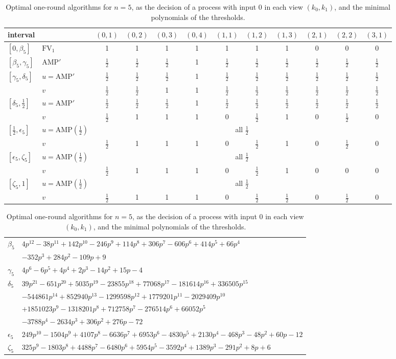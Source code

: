 \documentclass[11pt]{article}
\newcommand{\h}{\tfrac12}
\begin{document}
\begin{table}[t]
\centering
\small
\renewcommand{\arraystretch}{1.35}
\begin{tabular}{llcccccccccc}
\toprule
interval & & $(0,1)$&$(0,2)$&$(0,3)$&$(0,4)$&$(1,1)$&$(1,2)$&$(1,3)$&$(2,1)$&$(2,2)$&$(3,1)$\\
\midrule
$[0,\beta_5]$ & $\mathrm{FV}_1$ & 1&1&1&1&1&1&1&0&0&0\\
$[\beta_5,\gamma_5]$ & $\mathrm{AMP}'$ & $\h$&$\h$&$\h$&1&$\h$&$\h$&$\h$&$\h$&$\h$&$\h$\\
$[\gamma_5,\delta_5]$ & $u=\mathrm{AMP}'$ & $\h$&$\h$&$\h$&1&$\h$&$\h$&$\h$&$\h$&$\h$&$\h$\\
 & $v$ & $\h$&$\h$&1&1&$\h$&$\h$&$\h$&$\h$&$\h$&$\h$\\
$[\delta_5,\h]$ & $u=\mathrm{AMP}'$ & $\h$&$\h$&$\h$&1&$\h$&$\h$&$\h$&$\h$&$\h$&$\h$\\
 & $v$ & $\h$&1&1&1&0&$\h$&1&0&$\h$&0\\
$[\h,\epsilon_5]$ & $u=\mathrm{AMP}(\h)$ & \multicolumn{10}{c}{all $\h$}\\
 & $v$ & $\h$&1&1&1&0&$\h$&1&0&$\h$&0\\
$[\epsilon_5,\zeta_5]$ & $u=\mathrm{AMP}(\h)$ & \multicolumn{10}{c}{all $\h$}\\
 & $v$ & $\h$&1&1&1&0&$\h$&1&0&0&0\\
$[\zeta_5,1]$ & $u=\mathrm{AMP}(\h)$ & \multicolumn{10}{c}{all $\h$}\\
 & $v$ & $\h$&1&1&1&0&$\h$&$\h$&0&$\h$&0\\
\bottomrule
\end{tabular}

\medskip
\begin{tabular}{ll}
\toprule
$\beta_5$ & $4p^{12}-38p^{11}+142p^{10}-246p^9+114p^8+306p^7-606p^6+414p^5+66p^4$\\
 & \qquad$-352p^3+284p^2-109p+9$\\
$\gamma_5$ & $4p^6-6p^5+4p^4+2p^3-14p^2+15p-4$\\
$\delta_5$ & $39p^{21}-651p^{20}+5035p^{19}-23855p^{18}+77068p^{17}-181614p^{16}+336505p^{15}$\\
 & \qquad$-544861p^{14}+852940p^{13}-1299598p^{12}+1779201p^{11}-2029409p^{10}$\\
 & \qquad$+1851023p^{9}-1318201p^{8}+712758p^{7}-276514p^{6}+66052p^{5}$\\
 & \qquad$-3788p^{4}-2634p^{3}+306p^{2}+276p-72$\\
$\epsilon_5$ & $249p^{10}-1504p^9+4107p^8-6636p^7+6953p^6-4830p^5+2130p^4-468p^3-48p^2+60p-12$\\
$\zeta_5$ & $325p^9-1803p^8+4488p^7-6480p^6+5954p^5-3592p^4+1389p^3-291p^2+8p+6$\\
\bottomrule
\end{tabular}
\caption{Optimal one-round algorithms for $n=5$, as the decision of a process with input $0$ in each view $(k_0,k_1)$, and the minimal polynomials of the thresholds.}\label{tab:five}
\end{table}
\end{document}
